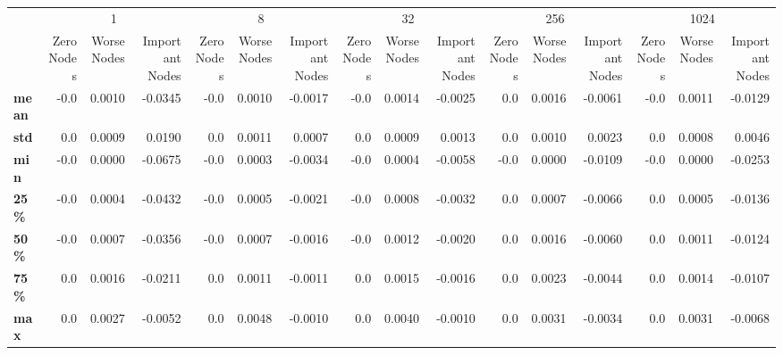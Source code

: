 \begin{tabular}{lrrrrrrrrrrrrrrr}
\toprule
{} & \multicolumn{3}{c}{1} & \multicolumn{3}{c}{8} & \multicolumn{3}{c}{32} & \multicolumn{3}{c}{256} & \multicolumn{3}{c}{1024} \\
{} & Zero Nodes & Worse Nodes & Important Nodes & Zero Nodes & Worse Nodes & Important Nodes & Zero Nodes & Worse Nodes & Important Nodes & Zero Nodes & Worse Nodes & Important Nodes & Zero Nodes & Worse Nodes & Important Nodes \\
\midrule
\textbf{mean} &       -0.0 &      0.0010 &         -0.0345 &       -0.0 &      0.0010 &         -0.0017 &       -0.0 &      0.0014 &         -0.0025 &        0.0 &      0.0016 &         -0.0061 &       -0.0 &      0.0011 &         -0.0129 \\
\textbf{std } &        0.0 &      0.0009 &          0.0190 &        0.0 &      0.0011 &          0.0007 &        0.0 &      0.0009 &          0.0013 &        0.0 &      0.0010 &          0.0023 &        0.0 &      0.0008 &          0.0046 \\
\textbf{min } &       -0.0 &      0.0000 &         -0.0675 &       -0.0 &      0.0003 &         -0.0034 &       -0.0 &      0.0004 &         -0.0058 &       -0.0 &      0.0000 &         -0.0109 &       -0.0 &      0.0000 &         -0.0253 \\
\textbf{25\% } &       -0.0 &      0.0004 &         -0.0432 &       -0.0 &      0.0005 &         -0.0021 &       -0.0 &      0.0008 &         -0.0032 &        0.0 &      0.0007 &         -0.0066 &        0.0 &      0.0005 &         -0.0136 \\
\textbf{50\% } &       -0.0 &      0.0007 &         -0.0356 &       -0.0 &      0.0007 &         -0.0016 &       -0.0 &      0.0012 &         -0.0020 &        0.0 &      0.0016 &         -0.0060 &        0.0 &      0.0011 &         -0.0124 \\
\textbf{75\% } &        0.0 &      0.0016 &         -0.0211 &        0.0 &      0.0011 &         -0.0011 &        0.0 &      0.0015 &         -0.0016 &        0.0 &      0.0023 &         -0.0044 &        0.0 &      0.0014 &         -0.0107 \\
\textbf{max } &        0.0 &      0.0027 &         -0.0052 &        0.0 &      0.0048 &         -0.0010 &        0.0 &      0.0040 &         -0.0010 &        0.0 &      0.0031 &         -0.0034 &        0.0 &      0.0031 &         -0.0068 \\
\bottomrule
\end{tabular}

